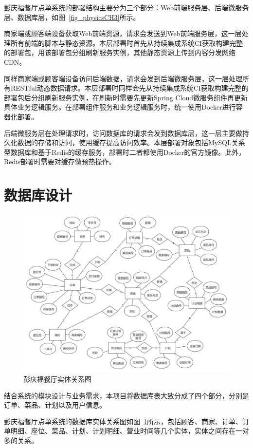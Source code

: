 彭庆福餐厅点单系统的部署结构主要分为三个部分：Web前端服务层、后端微服务层、数据库层，如图~\ref{fig_physicsCH3}所示。

商家端或顾客端设备获取Web前端资源，请求会发送到Web前端服务层，这一层处理所有前端的脚本与静态资源。本层部署时首先从持续集成系统CI获取构建完整的部署包，用该部署包分组刷新服务实例，其他静态资源上传到内容分发网络CDN。

同样商家端或顾客端设备访问后端数据，请求会发到后端微服务层，这一层处理所有RESTful动态数据请求。本层部署时同样会先从持续集成系统CI获取构建完整的部署包后分组刷新服务实例，在刷新时需要先更新Spring Cloud微服务组件再更新具体业务逻辑服务。在部署组件服务和业务逻辑服务时，统一使用Docker进行容器化部署。

后端微服务层在处理请求时，访问数据库的请求会发到数据库层，这一层主要做持久化数据的存储和访问，使用缓存提高访问效率。本层部署对象包括MySQL关系型数据库和基于Redis的缓存服务，部署时二者都使用Docker的官方镜像。此外，Redis部署时需要对缓存做预热操作。

\section{数据库设计}
\begin{figure}[htbp!]
  \centering
  \includegraphics[width=5in]{FIGs/chapter3/ER.pdf}
  \caption{彭庆福餐厅实体关系图}\label{fig_ERCH3}
\end{figure}

结合系统的模块设计与业务需求，本项目将数据库表大致分成了四个部分，分别是订单、菜品、计划以及用户信息。

彭庆福餐厅点单系统的数据库实体关系图如图~\ref{fig_ERCH3}所示，包括顾客、商家、订单、订单明细、座位、菜品、计划、计划明细、营业时间等几个实体，实体之间存在一对多的关系。

